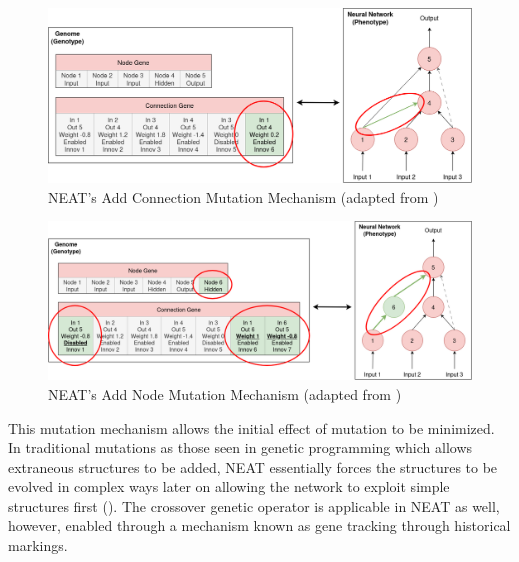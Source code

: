 \begin{figure}[H] %
	\centering %
	\includegraphics[width=\textwidth]{Figures/chapter_ne/ne_add_connection.png} %
	\caption{NEAT's Add Connection Mutation Mechanism (adapted from \cite{stanley2002evolving})}
	\label{fig:neat_add_connection} %
\end{figure}

\begin{figure}[H] %
	\centering %
	\includegraphics[width=\textwidth]{Figures/chapter_ne/ne_add_node.png} %
	\caption{NEAT's Add Node Mutation Mechanism (adapted from \cite{stanley2002evolving})}
	\label{fig:neat_add_node} %
\end{figure}

\noindent This mutation mechanism allows the initial effect of mutation to be minimized. In traditional mutations as those seen in genetic programming which allows extraneous structures to be added, NEAT essentially forces the structures to be evolved in complex ways later on allowing the network to exploit simple structures first (\cite{stanley2002evolving}). The crossover genetic operator is applicable in NEAT as well, however, enabled through a mechanism known as gene tracking through historical markings.

